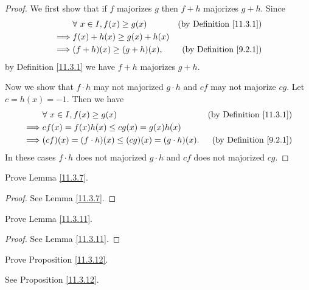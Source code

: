\begin{proof}
    We first show that if \(f\) majorizes \(g\) then \(f + h\) majorizes \(g + h\).
    Since
    \begin{align*}
                 & \forall\ x \in I, f(x) \geq g(x) & \text{(by Definition \ref{11.3.1})} \\
        \implies & f(x) + h(x) \geq g(x) + h(x)                                           \\
        \implies & (f + h)(x) \geq (g + h)(x),      & \text{(by Definition \ref{9.2.1})}
    \end{align*}
    by Definition \ref{11.3.1} we have \(f + h\) majorizes \(g + h\).

    Now we show that \(f \cdot h\) may not majorized \(g \cdot h\) and \(cf\) may not majorize \(cg\).
    Let \(c = h(x) = -1\).
    Then we have
    \begin{align*}
                 & \forall\ x \in I, f(x) \geq g(x)                        & \text{(by Definition \ref{11.3.1})} \\
        \implies & cf(x) = f(x) h(x) \leq cg(x) = g(x) h(x)                                                      \\
        \implies & (cf)(x) = (f \cdot h)(x) \leq (cg)(x) = (g \cdot h)(x). & \text{(by Definition \ref{9.2.1})}
    \end{align*}
    In these cases \(f \cdot h\) does not majorized \(g \cdot h\) and \(cf\) does not majorized \(cg\).
\end{proof}

\begin{exercise}\label{ex 11.3.3}
    Prove Lemma \ref{11.3.7}.
\end{exercise}

\begin{proof}
    See Lemma \ref{11.3.7}.
\end{proof}

\begin{exercise}\label{ex 11.3.4}
    Prove Lemma \ref{11.3.11}.
\end{exercise}

\begin{proof}
    See Lemma \ref{11.3.11}.
\end{proof}

\begin{exercise}\label{ex 11.3.5}
    Prove Proposition \ref{11.3.12}.
\end{exercise}

\begin{proposition}
    See Proposition \ref{11.3.12}.
\end{proposition}